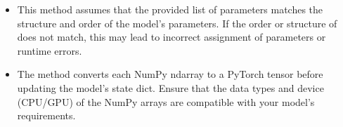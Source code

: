 \documentclass[letterpaper,10pt,english]{sphinxmanual}
\begin{document}
\begin{fulllineitems}
\begin{fulllineitems}
\begin{description}
\begin{sphinxVerbatim}[commandchars=\\\{\}]
  
  \PYG{p}{[}\PYG{p}{[}\PYG{p}{[} \PYG{p}{]} \PYG{p}{[} \PYG{p}{]}\PYG{p}{]} \PYG{p}{[} \PYG{p}{]}\PYG{p}{]}
\end{sphinxVerbatim}

\begin{itemize}
\item {} 
\sphinxAtStartPar
This method assumes that the provided list of parameters matches the structure and order of the model’s parameters. If the order or structure of  does not match, this may lead to incorrect assignment of parameters or runtime errors.

\item {} 
\sphinxAtStartPar
The method converts each NumPy ndarray to a PyTorch tensor before updating the model’s state dict. Ensure that the data types and device (CPU/GPU) of the NumPy arrays are compatible with your model’s requirements.

\end{itemize}

\end{description}

\end{fulllineitems}


\end{fulllineitems}

\end{document}
